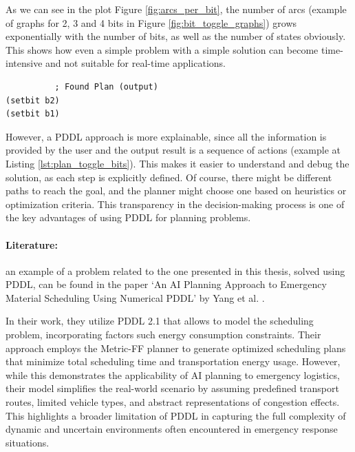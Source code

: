 As we can see in the plot Figure \ref{fig:arcs_per_bit}, the number of arcs (example
of graphs for 2, 3 and 4 bits in Figure \ref{fig:bit_toggle_graphs}) grows
exponentially with the number of bits, as well as the number of states obviously.
This shows how even a simple problem with a simple solution can become time-intensive
and not suitable for real-time applications.

\vspace{10mm}
\begin{codewindow}
    \begin{lstlisting}
          ; Found Plan (output)
(setbit b2)
(setbit b1)
\end{lstlisting}
\end{codewindow}
\vspace{10mm}

However, a PDDL approach is more explainable, since all the information is provided
by the user and the output result is a sequence of actions (example at Listing
\ref{lst:plan_toggle_bits}). This makes it easier to understand and debug the
solution, as each step is explicitly defined. Of course, there might be different
paths to reach the goal, and the planner might choose one based on heuristics or
optimization criteria. This transparency in the decision-making process is one of
the key advantages of using PDDL for planning problems.

\paragraph{Literature:}
an example of a problem related to the one presented in this thesis, solved using
PDDL, can be found in the paper `An AI Planning Approach to Emergency Material Scheduling
Using Numerical PDDL' by Yang et al. \cite{Yang2022}.

In their work, they utilize PDDL 2.1 that allows to model the scheduling problem,
incorporating factors such energy consumption constraints. Their approach
employs the Metric-FF planner to generate optimized scheduling plans that
minimize total scheduling time and transportation energy usage. However, while
this demonstrates the applicability of AI planning to emergency logistics, their
model simplifies the real-world scenario by assuming predefined transport routes,
limited vehicle types, and abstract representations of congestion effects. This
highlights a broader limitation of PDDL in capturing the full complexity of
dynamic and uncertain environments often encountered in emergency response
situations.

